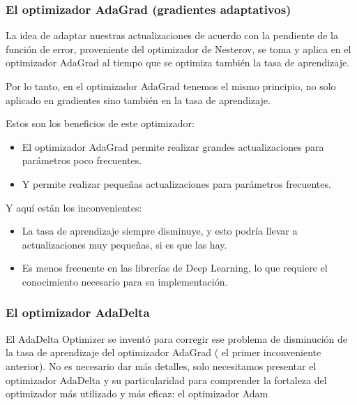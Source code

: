 \documentclass[]{book}
\providecommand{\tightlist}{%
  \setlength{\itemsep}{0pt}\setlength{\parskip}{0pt}}
\begin{document}
\hypertarget{el-optimizador-adagrad-gradientes-adaptativos}{%
\subsubsection{El optimizador AdaGrad (gradientes adaptativos)}\label{el-optimizador-adagrad-gradientes-adaptativos}}

La idea de adaptar nuestras actualizaciones de acuerdo con la pendiente de la función de error, proveniente del optimizador de Nesterov, se toma y aplica en el optimizador AdaGrad al tiempo que se optimiza también la tasa de aprendizaje.

Por lo tanto, en el optimizador AdaGrad tenemos el mismo principio, no solo aplicado en gradientes sino también en la tasa de aprendizaje.

Estos son los beneficios de este optimizador:

\begin{itemize}
\tightlist
\item
  El optimizador AdaGrad permite realizar grandes actualizaciones para parámetros poco frecuentes.
\item
  Y permite realizar pequeñas actualizaciones para parámetros frecuentes.
\end{itemize}

Y aquí están los inconvenientes:

\begin{itemize}
\tightlist
\item
  La tasa de aprendizaje siempre disminuye, y esto podría llevar a actualizaciones muy pequeñas, si es que las hay.
\item
  Es menos frecuente en las librerías de Deep Learning, lo que requiere el conocimiento necesario para su implementación.
\end{itemize}

\hypertarget{el-optimizador-adadelta}{%
\subsubsection{El optimizador AdaDelta}\label{el-optimizador-adadelta}}

El AdaDelta Optimizer se inventó para corregir ese problema de disminución de la tasa de aprendizaje del optimizador AdaGrad ( el primer inconveniente anterior). No es necesario dar más detalles, solo necesitamos presentar el optimizador AdaDelta y su particularidad para comprender la fortaleza del optimizador más utilizado y más eficaz: el optimizador Adam
\end{document}
